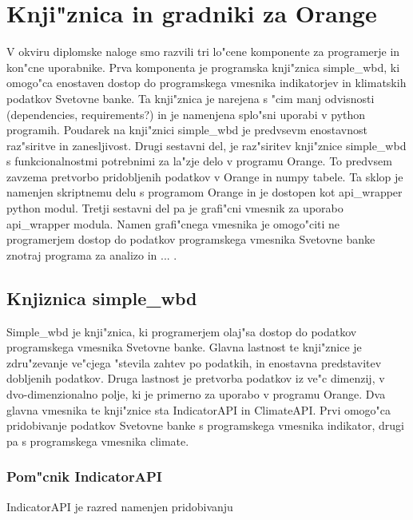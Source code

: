 \chapter{Knji"znica in gradniki za Orange}

V okviru diplomske naloge smo razvili tri lo"cene komponente za programerje in
kon"cne uporabnike. Prva komponenta je programska knji"znica simple\_wbd, ki
omogo"ca enostaven dostop do programskega vmesnika indikatorjev in klimatskih
podatkov Svetovne banke. Ta knji"znica je narejena s "cim manj odvisnosti
(dependencies, requirements?) in je namenjena splo"sni uporabi v python
programih. Poudarek na knji"znici simple\_wbd je predvsevm enostavnost 
raz"siritve in zanesljivost. Drugi sestavni del, je raz"siritev knji"znice
simple\_wbd s funkcionalnostmi potrebnimi za la"zje delo v programu Orange.
To predvsem zavzema pretvorbo pridobljenih podatkov v Orange in numpy tabele.
Ta sklop je namenjen skriptnemu delu s programom Orange in je dostopen kot
api\_wrapper python modul. Tretji sestavni del pa je grafi"cni vmesnik za
uporabo api\_wrapper modula. Namen grafi"cnega vmesnika je omogo"citi ne
programerjem dostop do podatkov programskega vmesnika Svetovne banke znotraj
programa za analizo in ... .

\section{Knjiznica simple\_wbd}

Simple\_wbd je knji"znica, ki programerjem olaj"sa dostop do podatkov
programskega vmesnika Svetovne banke. Glavna lastnost te knji"znice je
zdru"zevanje ve"cjega "stevila zahtev po podatkih, in enostavna predstavitev
dobljenih podatkov. Druga lastnost je pretvorba podatkov iz ve"c dimenzij, v
dvo-dimenzionalno polje, ki je primerno za uporabo v programu Orange. Dva
glavna vmesnika te knji"znice sta IndicatorAPI in ClimateAPI. Prvi omogo"ca
pridobivanje podatkov Svetovne banke s programskega vmesnika indikator, drugi
pa s programskega vmesnika climate.




% 



\subsection{Pom"cnik IndicatorAPI}

IndicatorAPI je razred namenjen pridobivanju 



